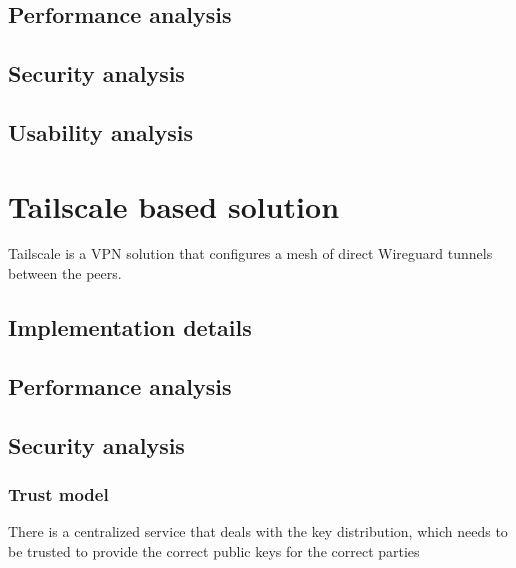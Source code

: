 \hypertarget{performance-analysis}{%
\section{Performance analysis}\label{performance-analysis}}

\hypertarget{security-analysis}{%
\section{Security analysis}\label{security-analysis}}

\hypertarget{usability-analysis}{%
\section{Usability analysis}\label{usability-analysis}}

\hypertarget{tailscale-based-solution}{%
\chapter{Tailscale based solution}\label{tailscale-based-solution}}

Tailscale is a VPN solution that configures a mesh of direct Wireguard
tunnels between the peers.

\hypertarget{implementation-details}{%
\section{Implementation details}\label{implementation-details}}

\hypertarget{performance-analysis}{%
\section{Performance analysis}\label{performance-analysis}}

\hypertarget{security-analysis}{%
\section{Security analysis}\label{security-analysis}}

\hypertarget{trust-model}{%
\subsection{Trust model}\label{trust-model}}

There is a centralized service that deals with the key distribution,
which needs to be trusted to provide the correct public keys for the
correct parties

